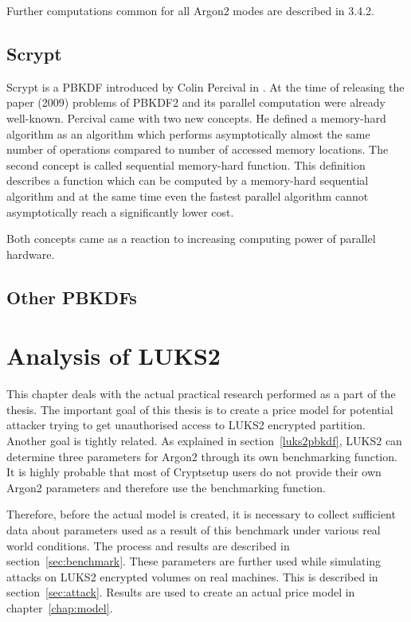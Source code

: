 \documentclass[nolof]{fithesis3}
\begin{document}
Further computations common for all Argon2 modes are described in \parencite{argon2draft}{3.4.2}.

\section{Scrypt}
Scrypt is a PBKDF introduced by Colin Percival in \parencite{memoryhard}. At the time of releasing the paper (2009) problems of PBKDF2 and its parallel computation were already well-known. Percival came with two new concepts. He defined a memory-hard algorithm as an algorithm which performs asymptotically almost the same number of operations compared to number of accessed memory locations. The second concept is called sequential memory-hard function. This definition describes a function which can be computed by a memory-hard sequential algorithm and at the same time even the fastest parallel algorithm cannot asymptotically reach a significantly lower cost.

Both concepts came as a reaction to increasing computing power of parallel hardware. 

\section{Other PBKDFs}

\chapter{Analysis of LUKS2}
This chapter deals with the actual practical research performed as a part of the thesis. The important goal of this thesis is to create a price model for potential attacker trying to get unauthorised access to LUKS2 encrypted partition. Another goal is tightly related. As explained in section~\ref{luks2pbkdf}, LUKS2 can determine three parameters for Argon2 through its own benchmarking function. It is highly probable that most of Cryptsetup users do not provide their own Argon2 parameters and therefore use the benchmarking function.

Therefore, before the actual model is created, it is necessary to collect sufficient data about parameters used as a result of  this benchmark under various real world conditions. The process and results are described in section~\ref{sec:benchmark}. These parameters are further used while simulating attacks on LUKS2 encrypted volumes on real machines.  This is described in section~\ref{sec:attack}. Results are used to create an actual price model in chapter~\ref{chap:model}.
\end{document}
